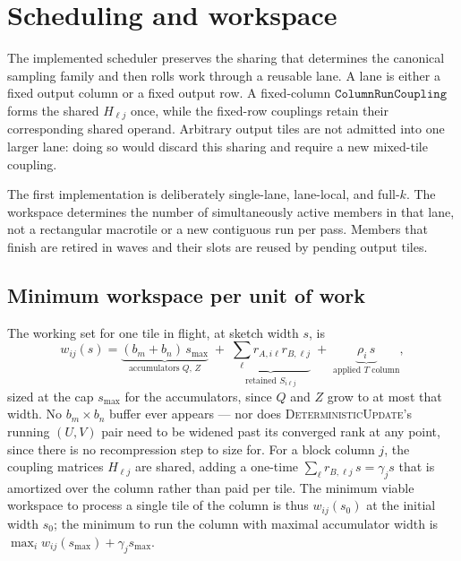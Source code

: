 \documentclass[11pt]{article}
\begin{document}
\section{Scheduling and workspace}
\label{sec:schedule}

The implemented scheduler preserves the sharing that determines the canonical
sampling family and then rolls work through a reusable lane. A lane is either
a fixed output column or a fixed output row. A fixed-column
$\texttt{ColumnRunCoupling}$ forms the shared $H_{\ell j}$ once, while the fixed-row
couplings retain their corresponding shared operand. Arbitrary output tiles
are not admitted into one larger lane: doing so would discard this sharing and
require a new mixed-tile coupling.

The first implementation is deliberately single-lane, lane-local, and
full-$k$. The workspace determines the number of simultaneously active members
in that lane, not a rectangular macrotile or a new contiguous run per pass.
Members that finish are retired in waves and their slots are reused by pending
output tiles.

\subsection{Minimum workspace per unit of work}
\label{sec:minws}

The working set for one tile in flight, at sketch width $s$, is
\begin{equation}
\label{eq:tilews}
w_{ij}(s)=
\underbrace{(b_m+b_n)\,s_{\max}}_{\text{accumulators }Q,\,Z}
\;+\;
\underbrace{\textstyle\sum_\ell r_{A,i\ell}r_{B,\ell j}}_{\text{retained }S_{i\ell j}}
\;+\;
\underbrace{\rho_i\,s}_{\text{applied }T\text{ column}},
\end{equation}
sized at the cap $s_{\max}$ for the accumulators, since $Q$ and $Z$ grow to at
most that width. No $b_m\times b_n$ buffer ever appears --- nor does
\textsc{DeterministicUpdate}'s running $(U,V)$ pair need to be widened past its
converged rank at any point, since there is no recompression step to size for.
For a block column $j$, the coupling matrices $H_{\ell j}$ are shared, adding a
one-time $\sum_\ell r_{B,\ell j}\,s=\gamma_j s$ that is amortized over the
column rather than paid per tile. The minimum viable workspace to process a
single tile of the column is thus $w_{ij}(s_0)$ at the initial width $s_0$; the
minimum to run the column with maximal accumulator width is
$\max_i w_{ij}(s_{\max})+\gamma_j s_{\max}$.
\end{document}
